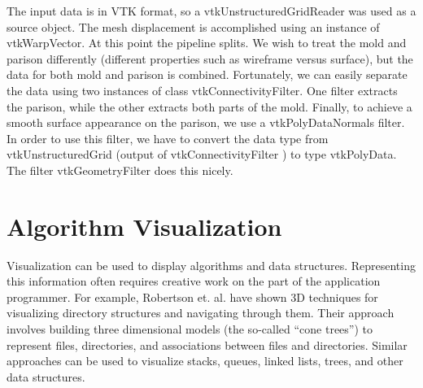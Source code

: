 The input data is in VTK format, so a vtkUnstructuredGridReader was used as a source object. The mesh displacement is accomplished using an instance of vtkWarpVector. At this point the pipeline splits. We wish to treat the mold and parison differently (different properties such as wireframe versus surface), but the data for both mold and parison is combined. Fortunately, we can easily separate the data using two instances of class vtkConnectivityFilter. One filter extracts the parison, while the other extracts both parts of the mold. Finally, to achieve a smooth surface appearance on the parison, we use a vtkPolyDataNormals filter. In order to use this filter, we have to convert the data type from vtkUnstructuredGrid (output of vtkConnectivityFilter ) to type vtkPolyData. The filter vtkGeometryFilter does this nicely.

\section{Algorithm Visualization}
Visualization can be used to display algorithms and data structures. Representing this information often requires creative work on the part of the application programmer. For example, Robertson et. al. \cite{Robertson91} have shown 3D techniques for visualizing directory structures and navigating through them. Their approach involves building three dimensional models (the so-called ``cone trees'') to represent files, directories, and associations between files and directories. Similar approaches can be used to visualize stacks, queues, linked lists, trees, and other data structures.


